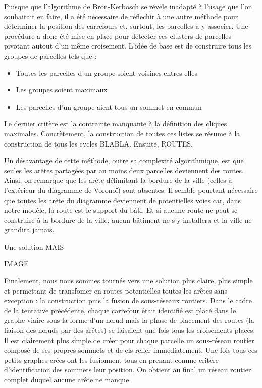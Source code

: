\documentclass[12pt]{article}
\begin{document}
Puisque que l'algorithme de Bron-Kerbosch se révèle inadapté à l'usage
que l'on souhaitait en faire, il a été nécessaire de réflechir à une
autre méthode pour déterminer la position des carrefours et, surtout,
les parcelles à y associer. Une procédure a donc été mise en place
pour détecter ces clusters de parcelles pivotant autout d'un même
croisement. L'idée de base est de construire tous les groupes de
parcelles tels que :

\begin{itemize}
\item{Toutes les parcelles d'un groupe soient voisines entres elles}
\item{Les groupes soient maximaux}
\item{Les parcelles d'un groupe aient tous un sommet en commun}
\end{itemize}

Le dernier critère est la contrainte manquante à la définition des
cliques maximales. Concrètement, la construction de toutes ces listes
se résume à la construction de tous les cycles BLABLA. Ensuite,
ROUTES.

Un désavantage de cette méthode, outre sa complexité algorithmique,
est que seules les arêtes partagées par au moins deux parcelles
deviennent des routes. Ainsi, on remarque que les arête délimitant la
bordure de la ville (celles à l'extérieur du diagramme de Voronoï)
sont absentes. Il semble pourtant nécessaire que toutes les arête du
diagramme deviennent de potentielles voies car, dans notre modèle, la
route est le support du bâti. Et si aucune route ne peut se construire
à la bordure de la ville, aucun bâtiment ne s'y installera et la ville
ne grandira jamais.

Une solution MAIS

IMAGE

Finalement, nous nous sommes tournés vers une solution plus claire,
plus simple et permettant de transfomer en routes potentielles toutes
les arêtes sans exception : la construction puis la fusion de
sous-réseaux routiers. Dans le cadre de la tentative précédente,
chaque carrefour était identifié est placé dans le graphe viaire sous
la forme d'un n\oe ud mais la phase de placement des routes (la
liaison des n\oe uds par des arêtes) se faisaient une fois tous les
croisements placés. Il est clairement plus simple de créer pour chaque
parcelle un sous-réseau routier composé de ses propres sommets et de
els relier immédiatement. Une fois tous ces petits graphes crées ont
les fusionnent tous en prenant comme critère d'identification des
sommets leur position. On obtient au final un réseau routier complet
duquel aucune arête ne manque.
\end{document}
